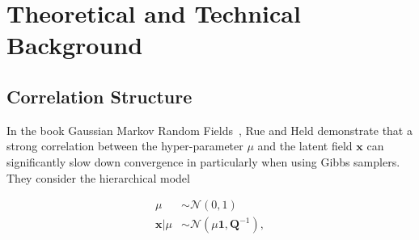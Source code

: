 \chapter{Theoretical and Technical Background}

\section{Correlation Structure}
\label{ap:Correlation}
In the book Gaussian Markov Random Fields~\cite{rue2005gaussian}, Rue and Held demonstrate that a strong correlation between the hyper-parameter $\mu$ and the latent field $\bm{x}$ can significantly slow down convergence in particularly when using Gibbs samplers.  
They consider the hierarchical model

\begin{subequations}
	\begin{align}
		\mu &\sim \mathcal{N}(0, 1) \\
		\bm{x} | \mu &\sim \mathcal{N}(\mu \bm{1}, \bm{Q}^{-1}),
	\end{align}
	\label{eq:rueMod}
\end{subequations}

